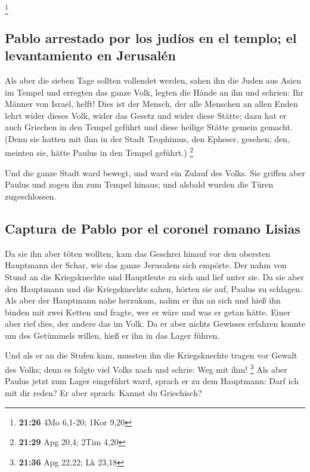 \footnote{\textbf{21:26} 4Mo 6,1-20; 1Kor 9,20}

\hypertarget{pablo-arrestado-por-los-juduxedos-en-el-templo-el-levantamiento-en-jerusaluxe9n}{%
\subsection{Pablo arrestado por los judíos en el templo; el
levantamiento en
Jerusalén}\label{pablo-arrestado-por-los-juduxedos-en-el-templo-el-levantamiento-en-jerusaluxe9n}}

 Als aber die sieben Tage sollten vollendet werden, sahen
ihn die Juden aus Asien im Tempel und erregten das ganze Volk, legten
die Hände an ihn und schrien:  Ihr Männer von Israel,
helft! Dies ist der Mensch, der alle Menschen an allen Enden lehrt wider
dieses Volk, wider das Gesetz und wider diese Stätte; dazu hat er auch
Griechen in den Tempel geführt und diese heilige Stätte gemein gemacht.
 (Denn sie hatten mit ihm in der Stadt Trophimus, den
Epheser, gesehen; den, meinten sie, hätte Paulus in den Tempel geführt.)
\footnote{\textbf{21:29} Apg 20,4; 2Tim 4,20}

 Und die ganze Stadt ward bewegt, und ward ein Zulauf des
Volks. Sie griffen aber Paulus und zogen ihn zum Tempel hinaus; und
alsbald wurden die Türen zugeschlossen.

\hypertarget{captura-de-pablo-por-el-coronel-romano-lisias}{%
\subsection{Captura de Pablo por el coronel romano
Lisias}\label{captura-de-pablo-por-el-coronel-romano-lisias}}

 Da sie ihn aber töten wollten, kam das Geschrei hinauf
vor den obersten Hauptmann der Schar, wie das ganze Jerusalem sich
empörte.  Der nahm von Stund an die Kriegsknechte und
Hauptleute zu sich und lief unter sie. Da sie aber den Hauptmann und die
Kriegsknechte sahen, hörten sie auf, Paulus zu schlagen. 
Als aber der Hauptmann nahe herzukam, nahm er ihn an sich und hieß ihn
binden mit zwei Ketten und fragte, wer er wäre und was er getan hätte.
 Einer aber rief dies, der andere das im Volk. Da er aber
nichts Gewisses erfahren konnte um des Getümmels willen, hieß er ihn in
das Lager führen.

 Und als er an die Stufen kam, mussten ihn die
Kriegsknechte tragen vor Gewalt des Volks;  denn es
folgte viel Volks nach und schrie: Weg mit ihm! \footnote{\textbf{21:36}
  Apg 22,22; Lk 23,18}  Als aber Paulus jetzt zum Lager
eingeführt ward, sprach er zu dem Hauptmann: Darf ich mit dir reden? Er
aber sprach: Kannst du Griechisch?

